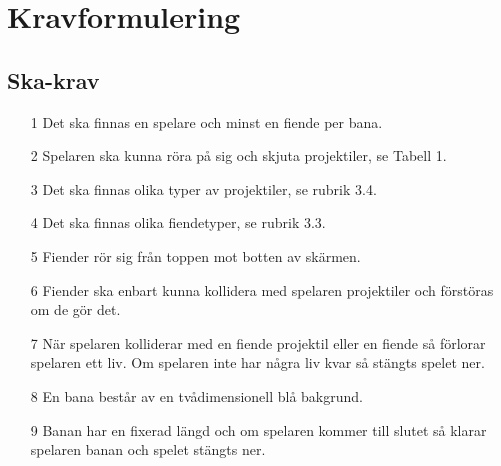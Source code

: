 \documentclass{TDP005mall}
\begin{document}
\section{Kravformulering}
\subsection{Ska-krav}
\begin{enumerate}
  \item [1] Det ska finnas en spelare och minst en fiende per bana.
  \item [2] Spelaren ska kunna röra på sig och skjuta projektiler, se Tabell 1.
  \item [3] Det ska finnas olika typer av projektiler, se rubrik 3.4.
  \item [4] Det ska finnas olika fiendetyper, se rubrik 3.3. 
  \item [5] Fiender rör sig från toppen mot botten av skärmen.
  \item [6] Fiender ska enbart kunna kollidera med spelaren projektiler och förstöras om de gör det.
  \item [7] När spelaren kolliderar med en fiende projektil eller en fiende så förlorar spelaren ett liv.
            Om spelaren inte har några liv kvar så stängts spelet ner.
  \item [8] En bana består av en tvådimensionell blå bakgrund.
  \item [9] Banan har en fixerad längd och om spelaren kommer till slutet så klarar spelaren banan och spelet stängts ner.
\end{enumerate}
\end{document}
